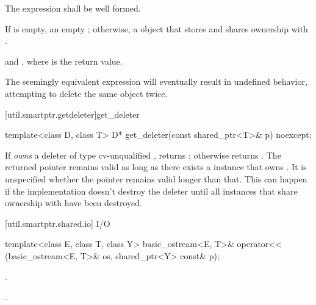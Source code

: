 \begin{itemdescr}
\pnum\requires  The expression  shall
be well formed.

\pnum\returns  If  is empty, an empty ; otherwise, a
 object that stores  and shares
ownership with .

\pnum
\postconditions {} and
, where  is the return value.

\pnum \enternote The seemingly equivalent expression
 will eventually result in
undefined behavior, attempting to delete the same object twice. \exitnote
\end{itemdescr}

[util.smartptr.getdeleter]{get_deleter}

%
%
\begin{itemdecl}
template<class D, class T> D* get_deleter(const shared_ptr<T>& p) noexcept;
\end{itemdecl}

\begin{itemdescr}
\pnum\returns  If  \textit{owns} a deleter  of type cv-unqualified
, returns ; otherwise returns . The returned
pointer remains valid as long as there exists a  instance
that owns . \enternote It is unspecified whether the pointer
remains valid longer than that. This can happen if the implementation doesn't destroy
the deleter until all  instances that share ownership with
 have been destroyed. \exitnote
\end{itemdescr}

[util.smartptr.shared.io]{ I/O}

%
%
\begin{itemdecl}
template<class E, class T, class Y>
  basic_ostream<E, T>& operator<< (basic_ostream<E, T>& os, shared_ptr<Y> const& p);
\end{itemdecl}

\begin{itemdescr}
\pnum\effects  {}.

\pnum\returns  {}.
\end{itemdescr}

